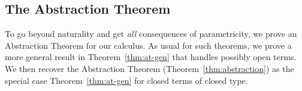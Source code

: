\documentclass{lmcs}
\theoremstyle{plain}\newtheorem{satz}[thm]{Satz}
\newcommand{\set}{\mathsf{Set}}
\newcommand{\map}{\mathsf{map}}
\begin{document}
\begin{comment}
So, we can conclude that
\begin{equation}
\map_{\setsem{\Gamma; \ol\alpha \vdash G} \rho[\ol{\alpha := \_}]} \ol{y}
  \circ 
  x_{\ol{{\setsem{\Gamma; \emptyset \vdash \sigma} \rho}}}
= x_{\ol{\setsem{\Gamma; \emptyset \vdash \tau} \rho} }
\circ \map_{\setsem{\Gamma; \ol\alpha \vdash F} 
  \rho[\ol{\alpha := \_}]} \, \ol{y}
\end{equation}

Moreover, for any $\ol{A, B: \set}$,
we can choose $\ol{\sigma = v}$ and $\ol{\tau = w}$ to be variables such that
$\ol{\rho v = A}$ and $\ol{\rho w = B}$.
Then for any functions $\ol{f : A \to B}$ we have that
\begin{equation}
\map_{\setsem{\Gamma; \ol\alpha \vdash G} \rho[\ol{\alpha := \_}]} \ol{f}
  \circ 
  x_{\ol{A}}
  = x_{\ol{B}}
\circ \map_{\setsem{\Gamma; \ol\alpha \vdash F} 
  \rho[\ol{\alpha := \_}]} \, \ol{f}
\end{equation}
\end{proof}
\end{comment}

\subsection{The Abstraction Theorem}\label{sec:thms} 

To go beyond naturality and get {\em all} consequences of
parametricity, we prove an Abstraction Theorem for our calculus. As
usual for such theorems, we prove a more general result in
Theorem~\ref{thm:at-gen} that handles possibly open terms. We then
recover the Abstraction Theorem (Theorem~\ref{thm:abstraction}) as the
special case Theorem~\ref{thm:at-gen} for closed terms of closed type.
\end{document}
